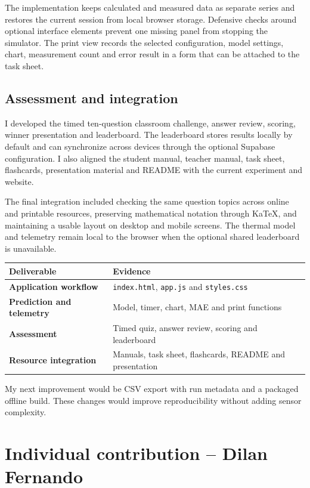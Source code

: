 \documentclass[9pt,a4paper]{extarticle}
\begin{document}
The implementation keeps calculated and measured data as separate series and restores the current session from local browser storage. Defensive checks around optional interface elements prevent one missing panel from stopping the simulator. The print view records the selected configuration, model settings, chart, measurement count and error result in a form that can be attached to the task sheet.

\subsection*{Assessment and integration}
I developed the timed ten-question classroom challenge, answer review, scoring, winner presentation and leaderboard. The leaderboard stores results locally by default and can synchronize across devices through the optional Supabase configuration. I also aligned the student manual, teacher manual, task sheet, flashcards, presentation material and README with the current experiment and website.

The final integration included checking the same question topics across online and printable resources, preserving mathematical notation through KaTeX, and maintaining a usable layout on desktop and mobile screens. The thermal model and telemetry remain local to the browser when the optional shared leaderboard is unavailable.

\begin{center}\small
\begin{tabularx}{0.86\textwidth}{@{}>{\bfseries}p{}X@{}}
\toprule
Deliverable & Evidence \\
\midrule
Application workflow & \texttt{index.html}, \texttt{app.js} and \texttt{styles.css} \\
Prediction and telemetry & Model, timer, chart, MAE and print functions \\
Assessment & Timed quiz, answer review, scoring and leaderboard \\
Resource integration & Manuals, task sheet, flashcards, README and presentation \\
\bottomrule
\end{tabularx}
\end{center}

My next improvement would be CSV export with run metadata and a packaged offline build. These changes would improve reproducibility without adding sensor complexity.

\clearpage
\section*{Individual contribution -- Dilan Fernando}
\end{document}
